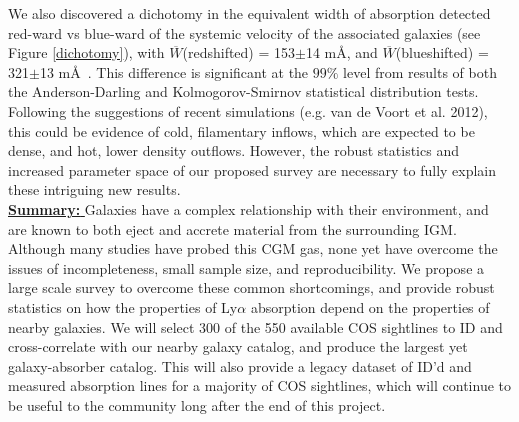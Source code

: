 \documentclass[12pt]{article}
\begin{document}
We also discovered a dichotomy in the equivalent width of absorption detected red-ward vs blue-ward of the systemic velocity of the associated galaxies (see Figure \ref{dichotomy}), with $\overline{W}$(redshifted) = 153$\pm$14 m\AA, and $\overline{W}$(blueshifted) = 321$\pm$13 m\AA~. This difference is significant at the $99\%$ level from results of both the Anderson-Darling and Kolmogorov-Smirnov statistical distribution tests. Following the suggestions of recent simulations (e.g. van de Voort et al. 2012), this could be evidence of cold, filamentary inflows, which are expected to be dense, and hot, lower density outflows. However, the robust statistics and increased parameter space of our proposed survey are necessary to fully explain these intriguing new results.\\

\noindent \underline{\textbf{Summary: }} Galaxies have a complex relationship with their environment, and are known to both eject and accrete material from the surrounding IGM. Although many studies have probed this CGM gas, none yet have overcome the issues of incompleteness, small sample size, and reproducibility. We propose a large scale survey to overcome these common shortcomings, and provide robust statistics on how the properties of Ly$\alpha$ absorption depend on the properties of nearby galaxies. We will select 300 of the 550 available COS sightlines to ID and cross-correlate with our nearby galaxy catalog, and produce the largest yet galaxy-absorber catalog. This will also provide a legacy dataset of ID'd and measured absorption lines for a majority of COS sightlines, which will continue to be useful to the community long after the end of this project.\\


%
\end{document}

